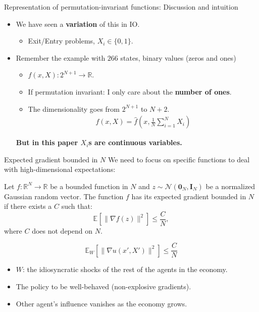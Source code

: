 \documentclass[aspectratio=169,10pt]{beamer}
\newcommand{\emphcolor}[1]{\textbf{\textcolor{emphcolorval}{#1}}}
\newcommand{\expec}[2][]{\ensuremath{\mathbb{E}_{{#1}}\left[ {#2} \right]}}
\begin{document}
\begin{frame}{Representation of permutation-invariant functions: Discussion and intuition}
	\begin{itemize}
			\item We have seen a \emphcolor{variation} of this in IO.\smallskip
			\begin{itemize}
				\item Exit/Entry problems, $X_i \in\{0,1\}$.\medskip
			\end{itemize}
			\item  Remember the example with $266$ states, binary values (zeros and ones)\smallskip
			\begin{itemize}
				\item  $f(x,X):2^{N+1} \rightarrow \mathbb{R}$.\smallskip
				\item If permutation invariant: I only care about the \emphcolor{number of ones}.\smallskip
				\item The dimensionality goes from $2^{N+1}$ to  $N+2$.\smallskip
				\begin{align*}
					f(x,X) = \hat{f}(x,\frac{1}{N} \sum_{i=1}^N X_i)
				\end{align*}
			\end{itemize} 
		\begin{center}
					\emphcolor{But in this paper $X_i$s are continuous variables.}
		\end{center}

	\end{itemize}

\end{frame}


\begin{frame}{Expected gradient bounded in $N$}
	We need to focus on specific functions to deal with high-dimensional expectations:
	\begin{definition} Let $f:\mathbb{R}^N\rightarrow \mathbb{R}$ be a bounded function in $N$ and $z\sim \mathcal{N}(\mathbf{0}_N,\mathbf{I}_N)$ be a normalized Gaussian random vector. The function $f$ has its expected gradient bounded in $N$ if there exists a $C$ such that:
		\begin{equation*}
			\expec{\|\nabla f(z)\|^2} \leq \frac{C}{N},
		\end{equation*}
		where $C$ does not depend on $N$.
	\end{definition}	
$$ \mathbb{E}_W \left[\|\nabla u(x',X')\|^2\right] \leq \frac{C}{N}$$
\begin{itemize}
	\item $W$: the idiosyncratic shocks of the rest of the agents in the economy.\smallskip
	\item The policy to be well-behaved (non-explosive gradients).\smallskip
	\item Other agent's influence vanishes as the economy grows.
\end{itemize}
\end{frame}
		
\end{document}
